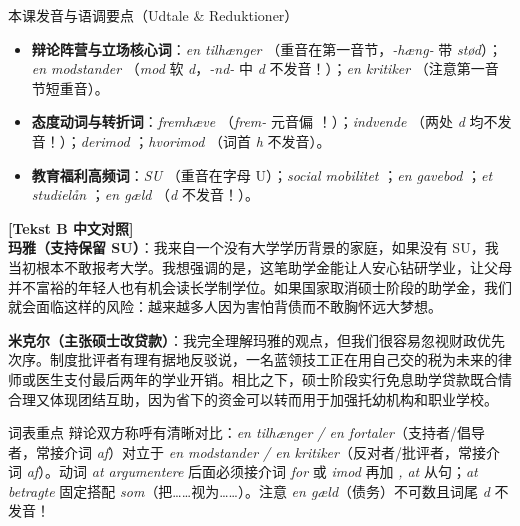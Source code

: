 \begin{tipbox}{本课发音与语调要点（Udtale \& Reduktioner）}
\begin{itemize}
  \item \textbf{辩论阵营与立场核心词}：\textit{en tilhænger} （重音在第一音节，\textit{-hæng-} 带 \textit{stød}）；\textit{en modstander} （\textit{mod} 软 \textit{d}，\textit{-nd-} 中 \textit{d} 不发音！）；\textit{en kritiker} （注意第一音节短重音）。
  \item \textbf{态度动词与转折词}：\textit{fremhæve} （\textit{frem-} 元音偏 ！）；\textit{indvende} （两处 \textit{d} 均不发音！）；\textit{derimod} ；\textit{hvorimod} （词首 \textit{h} 不发音）。
  \item \textbf{教育福利高频词}：\textit{SU} （重音在字母 U）；\textit{social mobilitet} ；\textit{en gavebod} ；\textit{et studielån} ；\textit{en gæld} （\textit{d} 不发音！）。
\end{itemize}
\end{tipbox}

\begin{transbox}
\small
\textbf{\color{NCDTeal}[Tekst B 中文对照]}\\
\textbf{玛雅（支持保留 SU）}：我来自一个没有大学学历背景的家庭，如果没有 SU，我当初根本不敢报考大学。我想强调的是，这笔助学金能让人安心钻研学业，让父母并不富裕的年轻人也有机会读长学制学位。如果国家取消硕士阶段的助学金，我们就会面临这样的风险：越来越多人因为害怕背债而不敢胸怀远大梦想。

\textbf{米克尔（主张硕士改贷款）}：我完全理解玛雅的观点，但我们很容易忽视财政优先次序。制度批评者有理有据地反驳说，一名蓝领技工正在用自己交的税为未来的律师或医生支付最后两年的学业开销。相比之下，硕士阶段实行免息助学贷款既合情合理又体现团结互助，因为省下的资金可以转而用于加强托幼机构和职业学校。
\end{transbox}


\begin{tipbox}{词表重点}
辩论双方称呼有清晰对比：\textit{en tilhænger / en fortaler}（支持者/倡导者，常接介词 \textit{af}）对立于 \textit{en modstander / en kritiker}（反对者/批评者，常接介词 \textit{af}）。动词 \textit{at argumentere} 后面必须接介词 \textit{for} 或 \textit{imod} 再加 \textit{, at} 从句；\textit{at betragte} 固定搭配 \textit{som}（把……视为……）。注意 \textit{en gæld}（债务）不可数且词尾 \textit{d} 不发音！
\end{tipbox}

